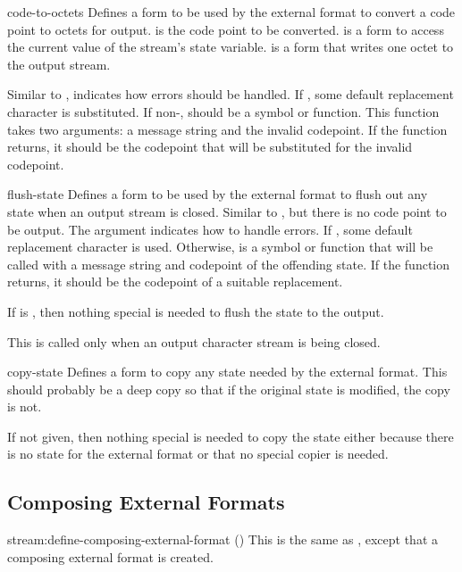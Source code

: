 \begin{defmac}{}{code-to-octets}{\args {} 
      \amprest{} }
  Defines a form to be used by the external format to convert a code
  point to octets for output.   is the code point to be
  converted.   is a form to access the current value of the
  stream's state variable.   is a form that writes one
  octet to the output stream.

  Similar to ,  indicates how errors
  should be handled.  If \nil, some default replacement character is
  substituted.  If non-\nil,  should be a symbol or
  function.   This function takes two arguments:  a message string and
  the invalid codepoint.  If the function returns, it should be the
  codepoint that will be substituted for the invalid codepoint.
\end{defmac}

\begin{defmac}{}{flush-state}{\args {}
      \amprest{} }
  Defines a form to be used by the external format to flush out
  any state when an output stream is closed.  Similar to
  , but there is no code point to be output.  The
   argument indicates how to handle errors.  If \nil, some
  default replacement character is used.  Otherwise,  is a
  symbol or function that will be called with a message string and
  codepoint of the offending state.  If the function returns, it
  should be the codepoint of a suitable replacement.

  If  is \false, then nothing special is needed to
  flush the state to the output.

  This is called only when an output character stream is being closed.
\end{defmac}

\begin{defmac}{}{copy-state}{\args {} \amprest{} }
  Defines a form to copy any state needed by the external format.
  This should probably be a deep copy so that if the original
  state is modified, the copy is not.

  If not given, then nothing special is needed to copy the state
  either because there is no state for the external format or that no
  special copier is needed.
\end{defmac}

\subsection{Composing External Formats}

\begin{defmac}{stream:}{define-composing-external-format}{\args {}
    () 
    }
  This is the same as , except that a
  composing external format is created.
\end{defmac}

